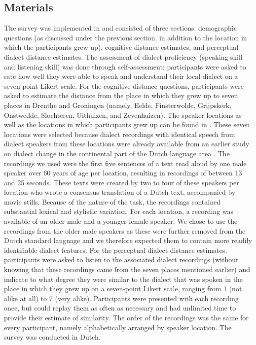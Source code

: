 \documentclass[output=paper,colorlinks,citecolor=brown,draft]{langscibook}
\begin{document}
\subsection{Materials}
The survey was implemented in \citet{qualtrics_qualtrics_2005} and consisted of three sections: demographic questions (as discussed under the previous section, in addition to the location in which the participants grew up), cognitive distance estimates, and perceptual dialect distance estimates. The assessment of dialect proficiency (speaking skill and listening skill) was done through self-assessment: participants were asked to rate how well they were able to speak and understand their local dialect on a seven-point Likert scale. For the cognitive distance questions, participants were asked to estimate the distance from the place in which they grew up to seven places in Drenthe and Groningen (namely, Eelde, Finsterwolde, Grijpskerk, Onstwedde, Slochteren, Uithuizen, and Zevenhuizen). The speaker locations as well as the locations in which participants grew up can be found in . These seven locations were selected because dialect recordings with identical speech from dialect speakers from these locations were already available from an earlier study on dialect change in the continental part of the Dutch language area \citep{heeringa_convergence_2014}. The recordings we used were the first five sentences of a text read aloud by one male speaker over 60 years of age per location, resulting in recordings of between 13 and 25 seconds. These texts were created by two to four of these speakers per location who wrote a consensus translation of a Dutch text, accompanied by movie stills. Because of the nature of the task, the recordings contained substantial lexical and stylistic variation. For each location, a recording was available of an older male and a younger female speaker. We chose to use the recordings from the older male speakers as these were further removed from the Dutch standard language \citep{heeringa_convergence_2014} and we therefore expected them to contain more readily identifiable dialect features. For the perceptual dialect distance estimates, participants were asked to listen to the associated dialect recordings (without knowing that these recordings came from the seven places mentioned earlier) and indicate to what degree they were similar to the dialect that was spoken in the place in which they grew up on a seven-point Likert scale, ranging from 1 (not alike at all) to 7 (very alike). Participants were presented with each recording once, but could replay them as often as necessary and had unlimited time to provide their estimate of similarity. The order of the recordings was the same for every participant, namely alphabetically arranged by speaker location. The survey was conducted in Dutch.
\end{document}
